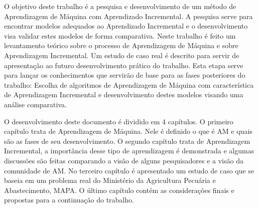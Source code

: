 O objetivo deste trabalho é a pesquisa e desenvolvimento de um método de Aprendizagem de Máquina com Aprendizado Incremental. A pesquisa serve para encontrar modelos adequados ao Aprendizado Incremental e o desenvolvimento visa validar estes modelos de forma comparativa. Neste trabalho é feito um levantamento teórico sobre o processo de Aprendizagem de Máquina e sobre Aprendizagem Incremental. Um estudo de caso real é descrito para servir de apresentação ao futuro desenvolvimento prático do trabalho. Esta etapa serve para lançar os conhecimentos que servirão de base para as fases posteriores do trabalho: Escolha de algoritmos de Aprendizagem de Máquina com característica de Aprendizagem Incremental e desenvolvimento destes modelos visando uma análise comparativa.

O desenvolvimento deste documento é dividido em 4 capítulos. O primeiro capítulo trata de Aprendizagem de Máquina. Nele é definido o que é AM e quais são as fases de seu desenvolvimento. O segundo capítulo trata de Aprendizagem Incremental, a importância desse tipo de aprendizagem é demonstrada e algumas discussões são feitas comparando a visão de alguns pesquisadores e a visão da comunidade de AM. No terceiro capítulo é apresentado um estudo de caso que se baseia em um problema real do Ministério da Agricultura Pecuária e Abastecimento, MAPA. O último capítulo contém as considerações finais e propostas para a continuação do trabalho.





